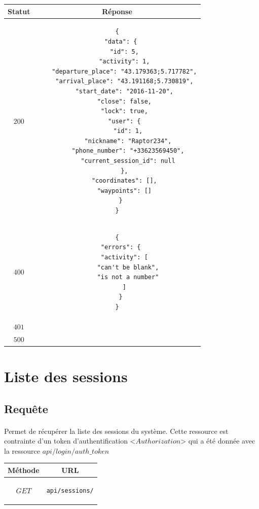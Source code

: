 \documentclass[titlepage, 12pt]{report}
\begin{document}
\begin{center}
	\begin{tabular}{|c|c|}
		\hline
		Statut & Réponse \\
		\hline
		$ 200 $ & \begin{lstlisting}
{
  "data": {
    "id": 5,
    "activity": 1,
    "departure_place": "43.179363;5.717782",
    "arrival_place": "43.191168;5.730819",
    "start_date": "2016-11-20",
    "close": false,
    "lock": true,
    "user": {
      "id": 1,
      "nickname": "Raptor234",
      "phone_number": "+33623569450",
      "current_session_id": null
    },
    "coordinates": [],
    "waypoints": []
  }
}
		\end{lstlisting} \\ 
		\hline
		$ 400 $ & \begin{lstlisting}
{
  "errors": {
    "activity": [
      "can't be blank",
      "is not a number"
    ]
  }
}
		\end{lstlisting} \\
		\hline
		$ 401 $ & \\
		\hline
		$ 500 $ & \\
		\hline
	\end{tabular}
\end{center}

%
%

\section{Liste des sessions}

\subsection{Requête}

\paragraph{} Permet de récupérer la liste des sessions du système. Cette ressource est contrainte d'un token d'authentification <$Authorization$> qui a été donnée avec la ressource $api/login/auth\_token$

\begin{center}
	\begin{tabular}{|c|c|}
	\hline
	Méthode & URL \\
	\hline
	$ GET $ 
	&
	\begin{lstlisting}
api/sessions/
	\end{lstlisting} 
	\\ \hline
	\end{tabular}
\end{center}
\end{document}
